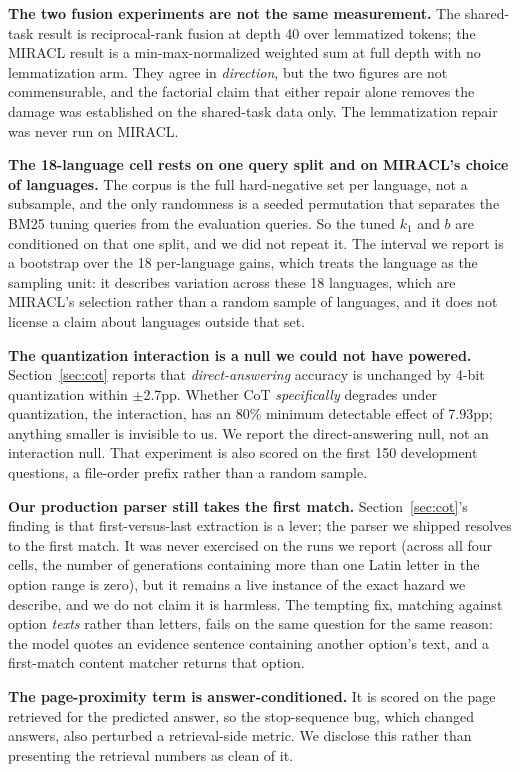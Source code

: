 \documentclass{article}
\begin{document}
\textbf{The two fusion experiments are not the same measurement.} The shared-task result is reciprocal-rank fusion at depth 40 over lemmatized tokens; the MIRACL result is a min-max-normalized weighted sum at full depth with no lemmatization arm. They agree in \emph{direction}, but the two figures are not commensurable, and the factorial claim that either repair alone removes the damage was established on the shared-task data only. The lemmatization repair was never run on MIRACL.

\textbf{The 18-language cell rests on one query split and on MIRACL's choice of languages.} The corpus is the full hard-negative set per language, not a subsample, and the only randomness is a seeded permutation that separates the BM25 tuning queries from the evaluation queries. So the tuned $k_1$ and $b$ are conditioned on that one split, and we did not repeat it. The interval we report is a bootstrap over the 18 per-language gains, which treats the language as the sampling unit: it describes variation across these 18 languages, which are MIRACL's selection rather than a random sample of languages, and it does not license a claim about languages outside that set.

\textbf{The quantization interaction is a null we could not have powered.} Section~\ref{sec:cot} reports that \emph{direct-answering} accuracy is unchanged by 4-bit quantization within $\pm$2.7pp. Whether CoT \emph{specifically} degrades under quantization, the interaction, has an 80\% minimum detectable effect of 7.93pp; anything smaller is invisible to us. We report the direct-answering null, not an interaction null. That experiment is also scored on the first 150 development questions, a file-order prefix rather than a random sample.

\textbf{Our production parser still takes the first match.} Section~\ref{sec:cot}'s finding is that first-versus-last extraction is a lever; the parser we shipped resolves to the first match. It was never exercised on the runs we report (across all four cells, the number of generations containing more than one Latin letter in the option range is zero), but it remains a live instance of the exact hazard we describe, and we do not claim it is harmless. The tempting fix, matching against option \emph{texts} rather than letters, fails on the same question for the same reason: the model quotes an evidence sentence containing another option's text, and a first-match content matcher returns that option.

\textbf{The page-proximity term is answer-conditioned.} It is scored on the page retrieved for the predicted answer, so the stop-sequence bug, which changed answers, also perturbed a retrieval-side metric. We disclose this rather than presenting the retrieval numbers as clean of it.
\end{document}
